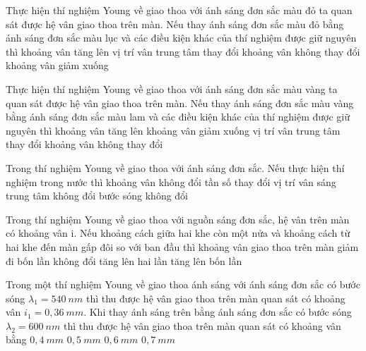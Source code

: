 \setcounter{paragraph}{0}
\setcounter{ex}{0}
\PhanI
\begin{ex}%
Thực hiện thí nghiệm Young về giao thoa với ánh sáng đơn sắc màu đỏ ta quan sát được hệ vân giao thoa trên màn. Nếu thay ánh sáng đơn sắc màu đỏ bằng ánh sáng đơn sắc màu lục và các điều kiện khác của thí nghiệm được giữ nguyên thì
\choice
{khoảng vân tăng lên}
{vị trí vân trung tâm thay đổi}
{khoảng vân không thay đổi}
{\True khoảng vân giảm xuống}
\end{ex} 
\begin{ex}%
Thực hiện thí nghiệm Young về giao thoa với ánh sáng đơn sắc màu vàng ta quan sát được hệ vân giao thoa trên màn. Nếu thay ánh sáng đơn sắc màu vàng bằng ánh sáng đơn sắc màu lam và các điều kiện khác của thí nghiệm được giữ nguyên thì
\choice
{khoảng vân tăng lên}
{\True khoảng vân giảm xuống}
{vị trí vân trung tâm thay đổi}
{khoảng vân không thay đổi}
\end{ex} 
\begin{ex}%
Trong thí nghiệm Young về giao thoa với ánh sáng đơn sắc. Nếu thực hiện thí nghiệm trong nước thì
\choice
{khoảng vân không đổi}
{tần số thay đổi}
{\True vị trí vân sáng trung tâm không đổi}
{bước sóng không đổi}
\end{ex} 
\begin{ex}%
Trong thí nghiệm Young về giao thoa với nguồn sáng đơn sắc, hệ vân trên màn có khoảng vân i. Nếu khoảng cách giữa hai khe còn một nửa và khoảng cách từ hai khe đến màn gấp đôi so với ban đầu thì khoảng vân giao thoa trên màn
\choice
{giảm đi bốn lần}
{không đổi}
{tăng lên hai lần}
{\True tăng lên bốn lần}

\end{ex} 
 \begin{ex}
 	Trong một thí nghiệm Young về giao thoa ánh sáng với ánh sáng đơn sắc có bước sóng $\lambda_{1}=540\ nm$ thì thu được hệ vân giao thoa trên màn quan sát có khoảng vân $i_{1}=0,36\ mm$. Khi thay ánh sáng trên bằng ánh sáng đơn sắc có bước sóng $\lambda_{2}=600\ nm$ thì thu được hệ vân giao thoa trên màn quan sát có khoảng vân bằng
 	\choice
 	{\True $0,4\ mm$}
 	{$0,5\ mm$}
 	{$0,6\ mm$}
 	{$0,7\ mm$}
 	\loigiai{  }
 \end{ex}
